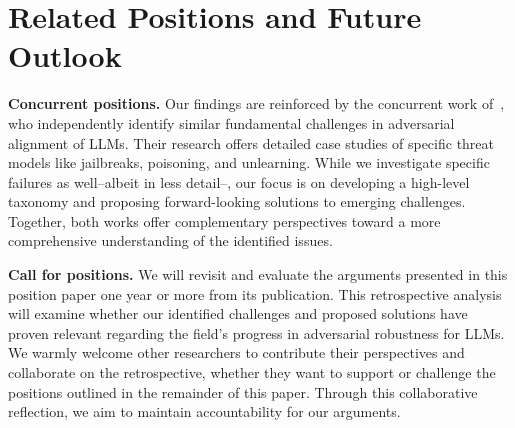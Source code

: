 
\section{Related Positions and Future Outlook} 

\textbf{Concurrent positions.} Our findings are reinforced by the concurrent work of~\citet{rando2025adversarial}, who independently identify similar fundamental challenges in adversarial alignment of LLMs. 
Their research offers detailed case studies of specific threat models like jailbreaks, poisoning, and unlearning. While we investigate specific failures as well--albeit in less detail--, our focus is on developing a high-level taxonomy and proposing forward-looking solutions to emerging challenges. 
Together, both works offer complementary perspectives toward a more comprehensive understanding of the identified issues.

\textbf{Call for positions.} We will revisit and evaluate the arguments presented in this position paper one year or more from its publication. This retrospective analysis will examine whether our identified challenges and proposed solutions have proven relevant regarding the field's progress in adversarial robustness for LLMs. We warmly welcome other researchers to contribute their perspectives and collaborate on the retrospective, whether they want to support or challenge the positions outlined in the remainder of this paper. Through this collaborative reflection, we aim to maintain accountability for our arguments.

